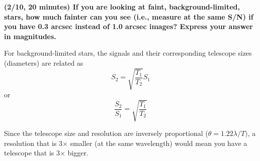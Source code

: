 \documentclass[12pt]{article}
\begin{document}
\textbf{(2/10, 20 minutes) If you are looking at faint, background-limited,
stars, how much fainter can you see (i.e., measure at the same S/N) if
you have 0.3 arcsec instead of 1.0 arcsec images? Express your answer
in magnitudes.}

For background-limited stars, the signals and their corresponding
telescope sizes (diameters) are related as
    $$ S_2 = \sqrt{\frac{T_1}{T_2}}S_1 $$
    or
    $$ \frac{S_2}{S_1} = \sqrt{\frac{T_1}{T_2}} $$

Since the telescope size and resolution are inversely proportional
($ \theta = 1.22\lambda/T)$, a resolution that is 3$\times$ smaller
(at the same wavelength) would mean you have a telescope that is
3$\times$ bigger. 
\end{document}
